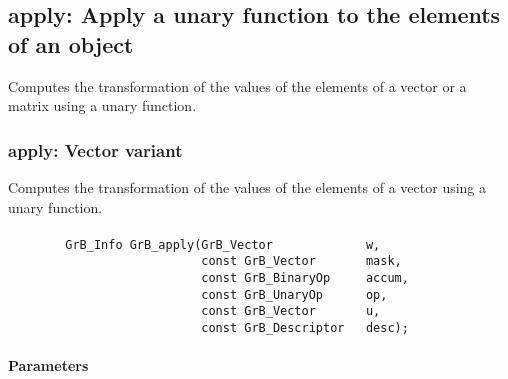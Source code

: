 \subsection{{\sf apply}: Apply a unary function to the elements of an object}
Computes the transformation of the values of the elements of a vector or a matrix using a unary function.


\subsubsection{{\sf apply}: Vector variant}
Computes the transformation of the values of the elements of a vector using a unary function.

\paragraph{\syntax}

\begin{verbatim}
        GrB_Info GrB_apply(GrB_Vector             w,
                           const GrB_Vector       mask,
                           const GrB_BinaryOp     accum,
                           const GrB_UnaryOp      op,
                           const GrB_Vector       u,
                           const GrB_Descriptor   desc);
\end{verbatim}

\paragraph{Parameters}

